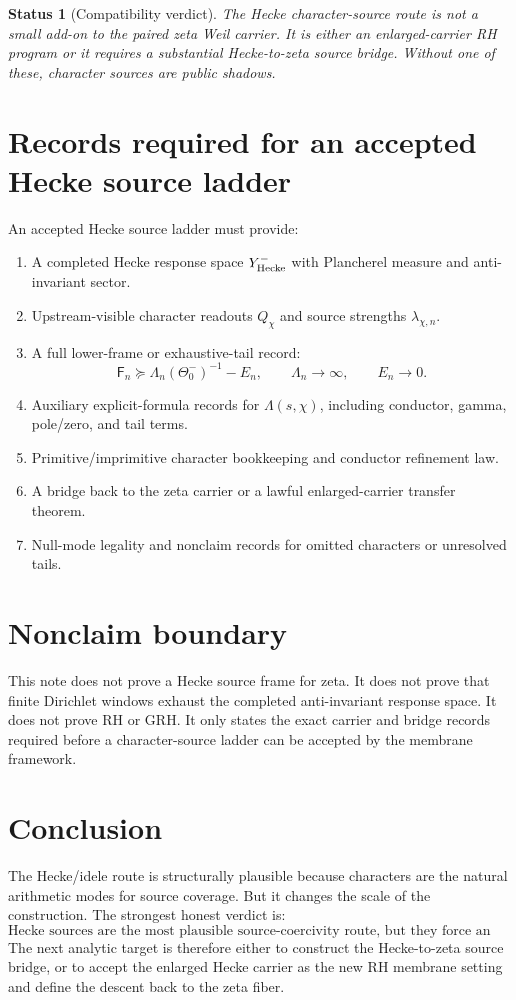 \documentclass[11pt]{article}
\newtheorem{status}{Status}
\newcommand{\F}{\mathsf F}
\begin{document}
\begin{status}[Compatibility verdict]
The Hecke character-source route is not a small add-on to the paired zeta Weil carrier. It is either an enlarged-carrier RH program or it requires a substantial Hecke-to-zeta source bridge. Without one of these, character sources are public shadows.
\end{status}

\section{Records required for an accepted Hecke source ladder}
An accepted Hecke source ladder must provide:
\begin{enumerate}[label=O\arabic*.]
\item A completed Hecke response space $Y^-_{\rm Hecke}$ with Plancherel measure and anti-invariant sector.
\item Upstream-visible character readouts $Q_\chi$ and source strengths $\lambda_{\chi,n}$.
\item A full lower-frame or exhaustive-tail record:
\[
\F_n\succeq \Lambda_n(\Theta_0^-)^{-1}-E_n,
\qquad \Lambda_n\to\infty,
\qquad E_n\to0.
\]
\item Auxiliary explicit-formula records for $\Lambda(s,\chi)$, including conductor, gamma, pole/zero, and tail terms.
\item Primitive/imprimitive character bookkeeping and conductor refinement law.
\item A bridge back to the zeta carrier or a lawful enlarged-carrier transfer theorem.
\item Null-mode legality and nonclaim records for omitted characters or unresolved tails.
\end{enumerate}

\section{Nonclaim boundary}
This note does not prove a Hecke source frame for zeta. It does not prove that finite Dirichlet windows exhaust the completed anti-invariant response space. It does not prove RH or GRH. It only states the exact carrier and bridge records required before a character-source ladder can be accepted by the membrane framework.

\section{Conclusion}
The Hecke/idele route is structurally plausible because characters are the natural arithmetic modes for source coverage. But it changes the scale of the construction. The strongest honest verdict is:
\[
\boxed{
\text{Hecke sources are the most plausible source-coercivity route, but they force an enlarged carrier or a major bridge.}
}
\]
The next analytic target is therefore either to construct the Hecke-to-zeta source bridge, or to accept the enlarged Hecke carrier as the new RH membrane setting and define the descent back to the zeta fiber.
\end{document}
